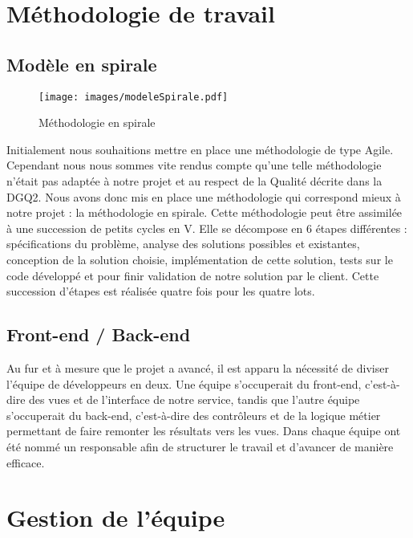 \documentclass[asi]{picInsa}
\begin{document}
\section{Méthodologie de travail}
\subsection{Modèle en spirale}
\begin{figure}[!h]
	\begin{center}
	\texttt{[image: images/modeleSpirale.pdf]}
	\label{diagrammeSpirale}
	\caption{Méthodologie en spirale}
	\end{center}
\end{figure}

Initialement nous souhaitions mettre en place une méthodologie de type Agile. Cependant nous nous sommes vite rendus compte qu'une telle méthodologie n'était pas adaptée à notre projet et au respect de la Qualité décrite dans la DGQ2. Nous avons donc mis en place une méthodologie qui correspond mieux à notre projet : la méthodologie en spirale. Cette méthodologie peut être assimilée à une succession de petits cycles en V. Elle se décompose en 6 étapes différentes : spécifications du problème, analyse des solutions possibles et existantes, conception de la solution choisie, implémentation de cette solution, tests sur le code développé et pour finir validation de notre solution par le client. Cette succession d'étapes est réalisée quatre fois pour les quatre lots.

\subsection{Front-end / Back-end}
Au fur et à mesure que le projet a avancé, il est apparu la nécessité de diviser l'équipe de développeurs en deux. Une équipe s'occuperait du front-end, c'est-à-dire des vues et de l'interface de notre service, tandis que l'autre équipe s'occuperait du back-end, c'est-à-dire des contrôleurs et de la logique métier permettant de faire remonter les résultats vers les vues. Dans chaque équipe ont été nommé un responsable afin de structurer le travail et d'avancer de manière efficace.



\section{Gestion de l'équipe}
\end{document}
